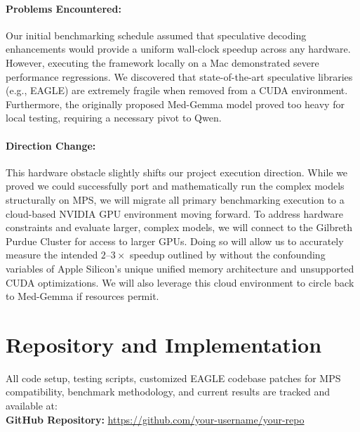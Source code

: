 \documentclass[11pt]{article}
\begin{document}
\paragraph{Problems Encountered:} Our initial benchmarking schedule assumed that speculative decoding enhancements would provide a uniform wall-clock speedup across any hardware. However, executing the framework locally on a Mac demonstrated severe performance regressions. We discovered that state-of-the-art speculative libraries (e.g., EAGLE) are extremely fragile when removed from a CUDA environment. Furthermore, the originally proposed Med-Gemma model proved too heavy for local testing, requiring a necessary pivot to Qwen.

\paragraph{Direction Change:} This hardware obstacle slightly shifts our project execution direction. While we proved we could successfully port and mathematically run the complex models structurally on MPS, we will migrate all primary benchmarking execution to a cloud-based NVIDIA GPU environment moving forward. To address hardware constraints and evaluate larger, complex models, we will connect to the Gilbreth Purdue Cluster for access to larger GPUs. Doing so will allow us to accurately measure the intended $2$--$3\times$ speedup outlined by \citet{leviathan2022fast} without the confounding variables of Apple Silicon's unique unified memory architecture and unsupported CUDA optimizations. We will also leverage this cloud environment to circle back to Med-Gemma if resources permit.

\section{Repository and Implementation}
All code setup, testing scripts, customized EAGLE codebase patches for MPS compatibility, benchmark methodology, and current results are tracked and available at: \\
\textbf{GitHub Repository:} \url{https://github.com/your-username/your-repo} %



\end{document}
